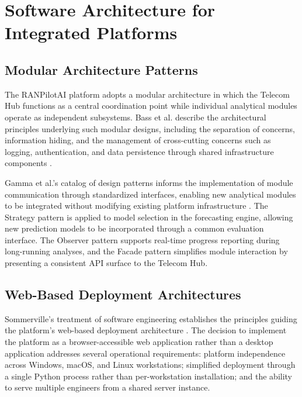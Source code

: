 \section{Software Architecture for Integrated Platforms}

\subsection{Modular Architecture Patterns}

The RANPilotAI platform adopts a modular architecture in which the Telecom Hub functions as a central coordination point while individual analytical modules operate as independent subsystems. Bass et al. describe the architectural principles underlying such modular designs, including the separation of concerns, information hiding, and the management of cross-cutting concerns such as logging, authentication, and data persistence through shared infrastructure components \cite{bass2021}.

Gamma et al.'s catalog of design patterns informs the implementation of module communication through standardized interfaces, enabling new analytical modules to be integrated without modifying existing platform infrastructure \cite{gamma1994}. The Strategy pattern is applied to model selection in the forecasting engine, allowing new prediction models to be incorporated through a common evaluation interface. The Observer pattern supports real-time progress reporting during long-running analyses, and the Facade pattern simplifies module interaction by presenting a consistent API surface to the Telecom Hub.

\subsection{Web-Based Deployment Architectures}

Sommerville's treatment of software engineering establishes the principles guiding the platform's web-based deployment architecture \cite{sommerville2015}. The decision to implement the platform as a browser-accessible web application rather than a desktop application addresses several operational requirements: platform independence across Windows, macOS, and Linux workstations; simplified deployment through a single Python process rather than per-workstation installation; and the ability to serve multiple engineers from a shared server instance.

